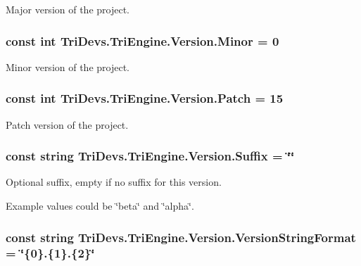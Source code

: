 Major version of the project. 

\hypertarget{class_tri_devs_1_1_tri_engine_1_1_version_ab7c39e50eec0bad0d6d09f64232081b5}{
\subsubsection[{Minor}]{\setlength{\rightskip}{0pt plus 5cm}const int Tri\-Devs.\-Tri\-Engine.\-Version.\-Minor = 0}}\label{class_tri_devs_1_1_tri_engine_1_1_version_ab7c39e50eec0bad0d6d09f64232081b5}


Minor version of the project. 

\hypertarget{class_tri_devs_1_1_tri_engine_1_1_version_a6dd7b2fc481a9e97df515538348ed9e8}{
\subsubsection[{Patch}]{\setlength{\rightskip}{0pt plus 5cm}const int Tri\-Devs.\-Tri\-Engine.\-Version.\-Patch = 15}}\label{class_tri_devs_1_1_tri_engine_1_1_version_a6dd7b2fc481a9e97df515538348ed9e8}


Patch version of the project. 

\hypertarget{class_tri_devs_1_1_tri_engine_1_1_version_a491a3f8d4f35c7a5b31331332a32381f}{
\subsubsection[{Suffix}]{\setlength{\rightskip}{0pt plus 5cm}const string Tri\-Devs.\-Tri\-Engine.\-Version.\-Suffix = \char`\"{}\char`\"{}}}\label{class_tri_devs_1_1_tri_engine_1_1_version_a491a3f8d4f35c7a5b31331332a32381f}


Optional suffix, empty if no suffix for this version. 

Example values could be \char`\"{}beta\char`\"{} and \char`\"{}alpha\char`\"{}. \hypertarget{class_tri_devs_1_1_tri_engine_1_1_version_adf5664e5d5b902a24c6f14b195dd6530}{
\subsubsection[{Version\-String\-Format}]{\setlength{\rightskip}{0pt plus 5cm}const string Tri\-Devs.\-Tri\-Engine.\-Version.\-Version\-String\-Format = \char`\"{}\{0\}.\{1\}.\{2\}\char`\"{}}}\label{class_tri_devs_1_1_tri_engine_1_1_version_adf5664e5d5b902a24c6f14b195dd6530}


